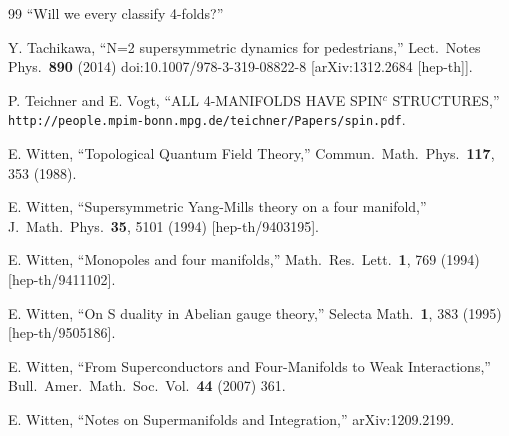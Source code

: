 \begin{thebibliography}{99}
 ``Will we every classify 4-folds?''

 Y. Tachikawa, ``N=2 supersymmetric dynamics for pedestrians,'' Lect.\
Notes Phys.\ \textbf{890} (2014) doi:10.1007/978-3-319-08822-8 [arXiv:1312.2684
[hep-th]].

 P. Teichner and E. Vogt, ``ALL 4-MANIFOLDS HAVE SPIN$^{c}$ STRUCTURES,''
\texttt{http://people.mpim-bonn.mpg.de/teichner/Papers/spin.pdf}.

 E. Witten, ``Topological Quantum Field Theory,'' Commun.\ Math.\ Phys.\
\textbf{117}, 353 (1988).

 E. Witten, ``Supersymmetric Yang-Mills theory on a four manifold,''
J.\ Math.\ Phys.\ \textbf{35}, 5101 (1994) [hep-th/9403195].

 E. Witten, ``Monopoles and four manifolds,'' Math.\ Res.\ Lett.\
\textbf{1}, 769 (1994) [hep-th/9411102].

\bibitem{ref56} E. Witten, ``On S duality in Abelian gauge theory,'' Selecta Math.\
\textbf{1}, 383 (1995) [hep-th/9505186].

 E. Witten, ``From Superconductors and Four-Manifolds to Weak
Interactions,'' Bull.\ Amer.\ Math.\ Soc.\ Vol.~\textbf{44} (2007) 361.

 E. Witten, ``Notes on Supermanifolds and Integration,'' arXiv:1209.2199.

\end{thebibliography}
